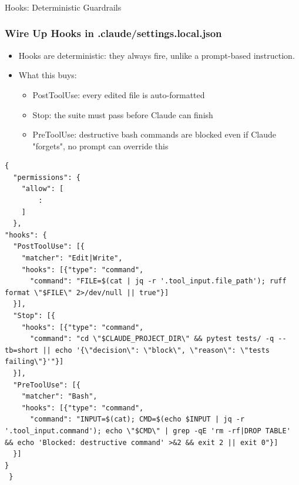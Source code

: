 \begin{frame}[fragile]\frametitle{}
\begin{center}
{\Large Hooks: Deterministic Guardrails}
\end{center}
\end{frame}


\begin{frame}[fragile]\frametitle{Wire Up Hooks in .claude/settings.local.json}
  \begin{itemize}
	\item Hooks are deterministic: they always fire, unlike a prompt-based instruction.
	\item What this buys:
	  \begin{itemize}
		\item PostToolUse: every edited file is auto-formatted
		\item Stop: the suite must pass before Claude can finish
		\item PreToolUse: destructive bash commands are blocked even if Claude "forgets", no prompt can override this
	  \end{itemize}
  \end{itemize}


\begin{lstlisting}
{
  "permissions": {
    "allow": [
		:
    ]
  },
"hooks": {
  "PostToolUse": [{
	"matcher": "Edit|Write",
	"hooks": [{"type": "command",
	  "command": "FILE=$(cat | jq -r '.tool_input.file_path'); ruff format \"$FILE\" 2>/dev/null || true"}]
  }],
  "Stop": [{
	"hooks": [{"type": "command",
	  "command": "cd \"$CLAUDE_PROJECT_DIR\" && pytest tests/ -q --tb=short || echo '{\"decision\": \"block\", \"reason\": \"tests failing\"}'"}]
  }],
  "PreToolUse": [{
	"matcher": "Bash",
	"hooks": [{"type": "command",
	  "command": "INPUT=$(cat); CMD=$(echo $INPUT | jq -r '.tool_input.command'); echo \"$CMD\" | grep -qE 'rm -rf|DROP TABLE' && echo 'Blocked: destructive command' >&2 && exit 2 || exit 0"}]
  }]
}
 }

\end{lstlisting}
\end{frame}


